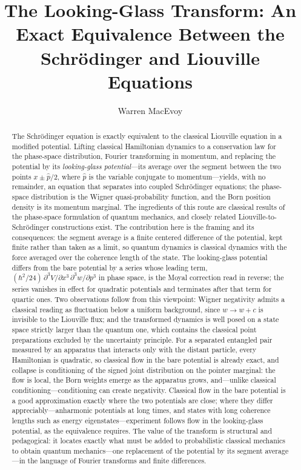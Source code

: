 \documentclass[12pt]{article}
\title{The Looking-Glass Transform: An Exact Equivalence Between the Schr\"odinger and Liouville Equations}
\author{Warren MacEvoy}
\begin{document}
\maketitle

\begin{abstract}
The Schr\"odinger equation is exactly equivalent to the classical Liouville equation in a modified potential.
Lifting classical Hamiltonian dynamics to a conservation law for the phase-space distribution, Fourier transforming in momentum, and replacing the potential by its \emph{looking-glass potential}---its average over the segment between the two points $x \pm \hat{p}/2$, where $\hat{p}$ is the variable conjugate to momentum---yields, with no remainder, an equation that separates into coupled Schr\"odinger equations; the phase-space distribution is the Wigner quasi-probability function, and the Born position density is its momentum marginal.
The ingredients of this route are classical results of the phase-space formulation of quantum mechanics, and closely related Liouville-to-Schr\"odinger constructions exist.
The contribution here is the framing and its consequences: the segment average is a finite centered difference of the potential, kept finite rather than taken as a limit, so quantum dynamics is classical dynamics with the force averaged over the coherence length of the state.  The looking-glass potential differs from the bare potential by a series whose leading term, $(\hbar^2/24)\, \partial^3 V/\partial x^3 \, \partial^3 w/\partial p^3$ in phase space, is the Moyal correction read in reverse; the series vanishes in effect for quadratic potentials and terminates after that term for quartic ones.
Two observations follow from this viewpoint: Wigner negativity admits a classical reading as fluctuation below a uniform background, since $w \rightarrow w + c$ is invisible to the Liouville flux; and the transformed dynamics is well posed on a state space strictly larger than the quantum one, which contains the classical point preparations excluded by the uncertainty principle.
For a separated entangled pair measured by an apparatus that interacts only with the distant particle, every Hamiltonian is quadratic, so classical flow in the bare potential is already exact, and collapse is conditioning of the signed joint distribution on the pointer marginal: the flow is local, the Born weights emerge as the apparatus grows, and---unlike classical conditioning---conditioning can create negativity.
Classical flow in the bare potential is a good approximation exactly where the two potentials are close; where they differ appreciably---anharmonic potentials at long times, and states with long coherence lengths such as energy eigenstates---experiment follows flow in the looking-glass potential, as the equivalence requires.
The value of the transform is structural and pedagogical: it locates exactly what must be added to probabilistic classical mechanics to obtain quantum mechanics---one replacement of the potential by its segment average---in the language of Fourier transforms and finite differences.
\end{abstract}
\end{document}
